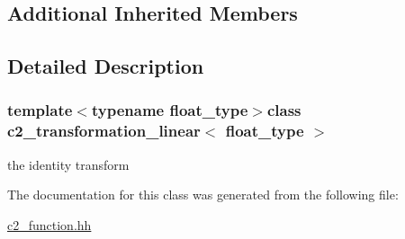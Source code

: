 \subsection*{Additional Inherited Members}


\subsection{Detailed Description}
\subsubsection*{template$<$typename float\-\_\-type$>$class c2\-\_\-transformation\-\_\-linear$<$ float\-\_\-type $>$}

the identity transform 

The documentation for this class was generated from the following file\-:\begin{DoxyCompactItemize}
\item 
\hyperlink{c2__function_8hh}{c2\-\_\-function.\-hh}\end{DoxyCompactItemize}
